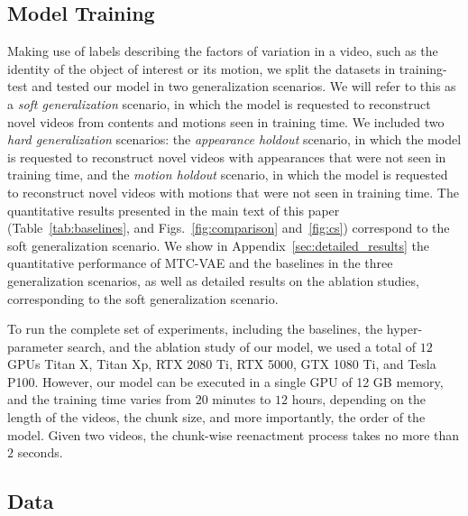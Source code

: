\subsection{Model Training}

Making use of labels describing the factors of variation in a video, such as the identity of the object of interest or its motion, we split the datasets in training-test and tested our model in two generalization scenarios.
We will refer to this as a \emph{soft generalization} scenario, in which the model is requested to reconstruct novel videos from contents and motions seen in training time.
We included two \emph{hard generalization} scenarios: the \emph{appearance holdout} scenario, in which the model is requested to reconstruct novel videos with appearances that were not seen in training time, and the \emph{motion holdout} scenario, in which the model is requested to reconstruct novel videos with motions that were not seen in training time.
The quantitative results presented in the main text of this paper (Table~\ref{tab:baselines}, and Figs.~\ref{fig:comparison} and~\ref{fig:cs}) correspond to the soft generalization scenario.
We show in Appendix~\ref{sec:detailed_results} the quantitative performance of MTC-VAE and the baselines in the three generalization scenarios, as well as detailed results on the ablation studies, corresponding to the soft generalization scenario.

To run the complete set of experiments, including the baselines, the hyper-parameter search, and the ablation study of our model, we used a total of $12$ GPUs Titan X, Titan Xp, RTX 2080 Ti, RTX 5000, GTX 1080 Ti, and Tesla P100.
However, our model can be executed in a single GPU of 12 GB memory, and the training time varies from $20$ minutes to $12$ hours, depending on the length of the videos, the chunk size, and more importantly, the order of the model.
Given two videos, the chunk-wise reenactment process takes no more than $2$ seconds.

\subsection{Data}
\label{sec:data}


